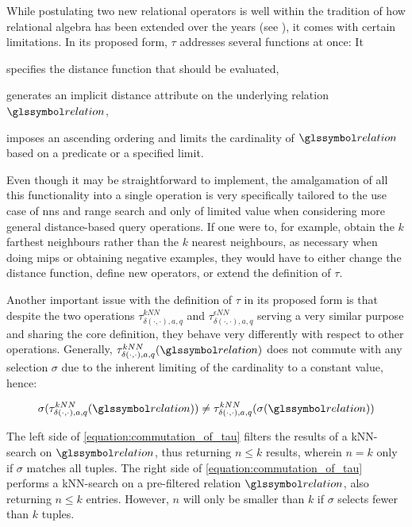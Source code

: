 While postulating two new relational operators is well within the tradition of how relational algebra has been extended over the years (see ), it comes with certain limitations. In its proposed form, $\tau$ addresses several functions at once: It
\begin{enumerate*}[label=(\roman*)]
    \item specifies the distance function that should be evaluated,
    \item generates an implicit distance attribute on the underlying relation $\relation$,
    \item imposes an ascending ordering and limits the cardinality of $\relation$ based on a predicate or a specified limit.
\end{enumerate*}

Even though it may be straightforward to implement, the amalgamation of all this functionality into a single operation is very specifically tailored to the use case of \acrshort{nns} and range search and only of limited value when considering more general distance-based query operations. If one were to, for example, obtain the $k$ farthest neighbours rather than the $k$ nearest neighbours, as necessary when doing \acrshort{mips} or obtaining negative examples, they would have to either change the distance function, define new operators, or extend the definition of $\tau$. 

Another important issue with the definition of $\tau$ in its proposed form is that despite the two operations $\tau^{kNN}_{\delta(\cdot,\cdot),a,q}$ and $\tau^{\epsilon NN}_{\delta(\cdot,\cdot),a,q}$ serving a very similar purpose and sharing the core definition, they behave very differently with respect to other operations. Generally, $\tau^{kNN}_{\delta(\cdot,\cdot),a,q}(\relation)$ does not commute with any selection $\sigma$ due to the inherent limiting of the cardinality to a constant value, hence:

\begin{equation}
    \label{equation:commutation_of_tau}
    \sigma(\tau^{kNN}_{\delta(\cdot,\cdot),a,q}(\relation)) \neq \tau^{kNN}_{\delta(\cdot,\cdot),a,q}(\sigma(\relation))
\end{equation}

The left side of \cref{equation:commutation_of_tau} filters the results of a kNN-search on $\relation$, thus returning $n \leq k$ results, wherein $n = k$ only if $\sigma$ matches all tuples. The right side of \cref{equation:commutation_of_tau} performs a kNN-search on a pre-filtered relation $\relation$, also returning $n \leq k$ entries. However, $n$ will only be smaller than $k$ if $\sigma$ selects fewer than $k$ tuples.